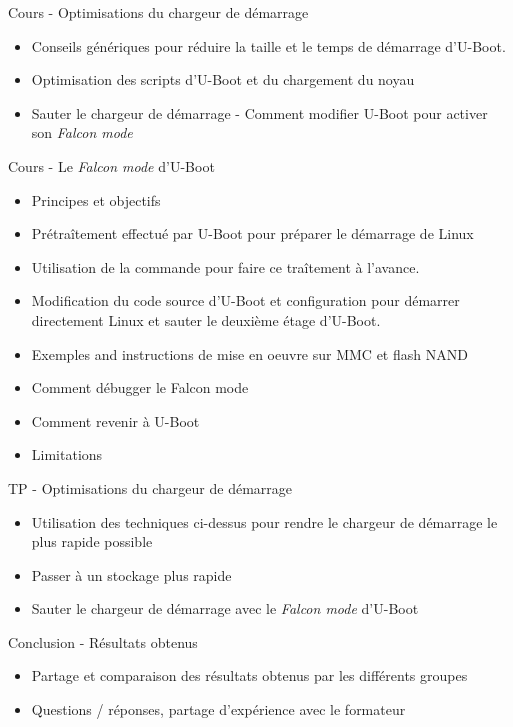 \documentclass[a4paper,12pt,obeyspaces,spaces,hyphens]{article}
\begin{document}
\feagendatwocolumn
{Cours - Optimisations du chargeur de démarrage}
{
  \begin{itemize}
  \item Conseils génériques pour réduire la taille et le temps
        de démarrage d'U-Boot.
  \item Optimisation des scripts d'U-Boot et du chargement du noyau
  \item Sauter le chargeur de démarrage - Comment modifier U-Boot pour
	activer son {\em Falcon mode}
  \end{itemize}
}
{Cours - Le {\em Falcon mode} d'U-Boot}
{
  \begin{itemize}
  \item Principes et objectifs
  \item Prétraîtement effectué par U-Boot pour préparer le démarrage de Linux
  \item Utilisation de la commande  pour faire ce traîtement à l'avance.
  \item Modification du code source d'U-Boot et configuration pour démarrer directement
        Linux et sauter le deuxième étage d'U-Boot.
  \item Exemples and instructions de mise en oeuvre sur MMC et flash NAND
  \item Comment débugger le Falcon mode
  \item Comment revenir à U-Boot
  \item Limitations
  \end{itemize}
}

\feagendaonecolumn
{TP - Optimisations du chargeur de démarrage}
{
 \begin{itemize}
 \item Utilisation des techniques ci-dessus pour rendre le chargeur
       de démarrage le plus rapide possible
 \item Passer à un stockage plus rapide
 \item Sauter le chargeur de démarrage avec le {\em Falcon mode} d'U-Boot
 \end{itemize}
}

\feagendaonecolumn
{Conclusion - Résultats obtenus}
{
 \begin{itemize}
 \item Partage et comparaison des résultats obtenus par les différents groupes
 \item Questions / réponses, partage d'expérience avec le formateur
 \end{itemize}
}
\end{document}
